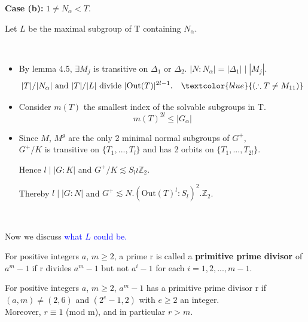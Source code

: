 \documentclass{beamer}
\def\Out{\mathrm{Out}}
\begin{document}
\begin{frame}
\textbf{Case (b): } $1\neq N_\alpha< T$.

Let $L$ be the maximal subgroup of T containing $N_\alpha$.

\ 
\begin{itemize}
	\item By lemma 4.5, $\exists M_j$ is transitive on $\Delta_1$ or $\Delta_2$. $|N:N_\alpha|=|\Delta_1|\mid |M_j|$.
\[ |T|/|N_\alpha|\text{ and } |T|/|L|\text{ divide } |\Out(T)|^{2l-1}. \quad\textcolor{blue}{(\therefore T\neq M_{11})}\]
	\item Consider $m(T)$ the smallest index of the
solvable subgroups in T.
\[ m(T)^{2l}\leq |G_\alpha|\]
	\item Since $M$, $M^g$ are the only 2 minimal normal subgroups of $G^+$, \\$G^+/K$ is transitive on $\{T_1,...,T_l\}$ and has 2 orbits on $\{T_1,...,T_{2l}\}$.

Hence $l\mid|G:K|$ and $G^+/K\lesssim S_l\wr\mathbb{Z}_2$. 

Thereby $l\mid |G:N|$ and $G^+\lesssim N.(\Out(T)^l:S_l)^2.\mathbb{Z}_2$.
\end{itemize}

\ 

Now we discuss \textcolor{blue}{what $L$ could be.}
\end{frame}


\begin{frame}

\begin{definition}[p.p.d.]
For positive integers $a$, $m \geq  2$, a prime r is called a \textbf{primitive prime divisor} of $a^m - 1$ if r divides $a^m -1$ but not $a^i-1$ for each $i = 1,2,...,m-1$. 
\end{definition}

\begin{lemma}[2.1, Zsigmondy]
For positive integers $a$, $m \geq 2$, $a^m - 1$ has a primitive prime divisor r if $(a,m) \neq  (2,6)$ and $(2^e - 1,2)$ with $e \geq 2$ an integer. \\Moreover, $r\equiv 1$ (mod m), and in particular $r > m$.
\end{lemma}
\end{frame}
\end{document}
